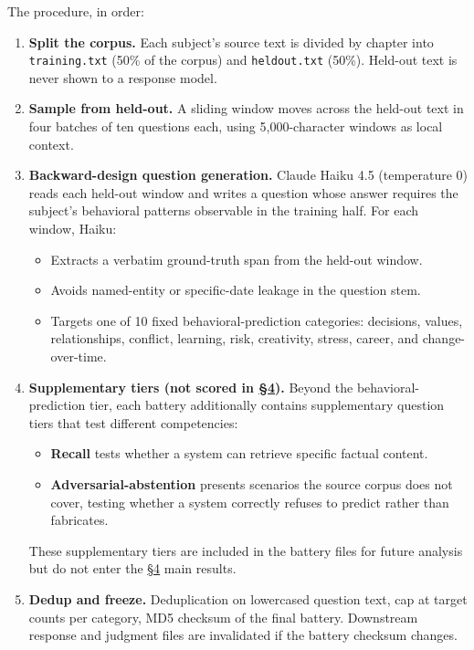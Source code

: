 The procedure, in order:

\begin{enumerate}
\def\labelenumi{\arabic{enumi}.}
\item
  \textbf{Split the corpus.} Each subject's source text is divided by
  chapter into \texttt{training.txt} (50\% of the corpus) and
  \texttt{heldout.txt} (50\%). Held-out text is never shown to a
  response model.
\item
  \textbf{Sample from held-out.} A sliding window moves across the
  held-out text in four batches of ten questions each, using
  5,000-character windows as local context.
\item
  \textbf{Backward-design question generation.} Claude Haiku 4.5
  (temperature 0) reads each held-out window and writes a question whose
  answer requires the subject's behavioral patterns observable in the
  training half. For each window, Haiku:

  \begin{itemize}
  \tightlist
  \item
    Extracts a verbatim ground-truth span from the held-out window.
  \item
    Avoids named-entity or specific-date leakage in the question stem.
  \item
    Targets one of 10 fixed behavioral-prediction categories: decisions,
    values, relationships, conflict, learning, risk, creativity, stress,
    career, and change-over-time.
  \end{itemize}
\item
  \textbf{Supplementary tiers (not scored in \hyperref[results]{§4}).} Beyond the
  behavioral-prediction tier, each battery additionally contains
  supplementary question tiers that test different competencies:

  \begin{itemize}
  \tightlist
  \item
    \textbf{Recall} tests whether a system can retrieve specific factual
    content.
  \item
    \textbf{Adversarial-abstention} presents scenarios the source corpus
    does not cover, testing whether a system correctly refuses to
    predict rather than fabricates.
  \end{itemize}

  These supplementary tiers are included in the battery files for future
  analysis but do not enter the \hyperref[results]{§4} main results.
\item
  \textbf{Dedup and freeze.} Deduplication on lowercased question text,
  cap at target counts per category, MD5 checksum of the final battery.
  Downstream response and judgment files are invalidated if the battery
  checksum changes.
\end{enumerate}

